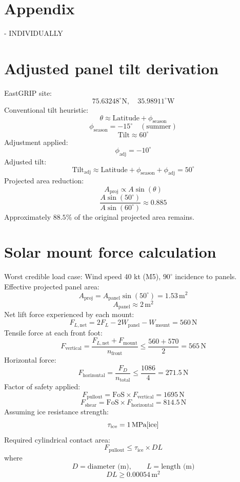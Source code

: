 \documentclass[11pt,a4paper]{article}
\begin{document}
\section{Appendix} - INDIVIDUALLY 
\appendix



\section{Adjusted panel tilt derivation}
\label{app:Adjusted panel tilt derivation}

EastGRIP site:
\[
75.63248^\circ \text{N}, \quad 35.98911^\circ \text{W}
\]
Conventional tilt heuristic:
\[
\theta \approx \text{Latitude} + \phi_{\text{season}}
\]
\[
\phi_{\text{season}} = -15^\circ \quad (\text{summer})
\]
\[
\text{Tilt} \approx 60^\circ
\]
Adjustment applied:
\[
\phi_{\text{adj}} = -10^\circ
\]
Adjusted tilt:
\[
\text{Tilt}_{\text{adj}} \approx \text{Latitude} + \phi_{\text{season}} + \phi_{\text{adj}} = 50^\circ
\]
Projected area reduction:
\[
A_{\text{proj}} \propto A \sin(\theta)
\]
\[
\frac{A\sin(50^\circ)}{A\sin(60^\circ)} \approx 0.885
\]
Approximately $88.5\%$ of the original projected area remains.


\section{Solar mount force calculation}
\label{app:Solar mount}
Worst credible load case:
Wind speed 40 kt (M5), $90^\circ$ incidence to panels.
Effective projected panel area:
\[
A_{\text{proj}} = A_{\text{panel}}\sin(50^\circ) = 1.53\,\text{m}^2
\]
\[
A_{\text{panel}} \approx 2\,\text{m}^2
\]
Net lift force experienced by each mount:
\[
F_{L,\text{net}} = 2F_L - 2W_{\text{panel}} - W_{\text{mount}} = 560\,\text{N}
\]
Tensile force at each front foot:
\[
F_{\text{vertical}} = \frac{F_{L,\text{net}} + F_{\text{mount}}}{n_{\text{front}}}
\leq \frac{560 + 570}{2} = 565\,\text{N}
\]
Horizontal force:
\[
F_{\text{horizontal}} = \frac{F_D}{n_{\text{total}}}
\leq \frac{1086}{4} = 271.5\,\text{N}
\]
Factor of safety applied:
\[
F_{\text{pullout}} = \text{FoS} \times F_{\text{vertical}} = 1695\,\text{N}
\]
\[
F_{\text{shear}} = \text{FoS} \times F_{\text{horizontal}} = 814.5\,\text{N}
\]
Assuming ice resistance strength:
\[
\tau_{\text{ice}} = 1\,\text{MPa} \cite{ice}
\]
Required cylindrical contact area:
\[
F_{\text{pullout}} \leq \tau_{\text{ice}} \times D L
\]
where
\[
D = \text{diameter (m)}, \qquad L = \text{length (m)}
\]
\[
DL \geq 0.00054\,\text{m}^2
\]
\end{document}
